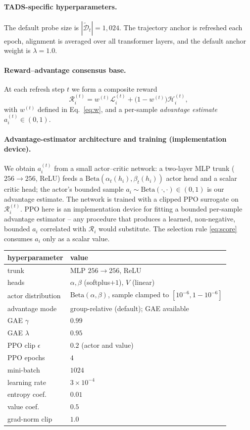 \paragraph{\textsc{TADS}-specific hyperparameters.}
The default probe size is
$|\widetilde{\mathcal{D}}_t|=1{,}024$. The trajectory anchor is
refreshed each epoch, alignment is averaged over all transformer
layers, and the default anchor weight is $\lambda=1.0$.

\paragraph{Reward--advantage consensus base.}
At each refresh step $t$ we form a composite reward
\[
\mathcal{R}_i^{(t)}
=
w^{(t)}\mathcal{L}_i^{(t)}
+
\bigl(1-w^{(t)}\bigr)\mathcal{H}_i^{(t)},
\]
with $w^{(t)}$ defined in Eq.~\ref{eq:w}, and a per-sample
\emph{advantage estimate} $a_i^{(t)} \in (0,1)$.

\paragraph{Advantage-estimator architecture and training
(implementation device).}
We obtain $a_i^{(t)}$ from a small actor--critic network: a
two-layer MLP trunk ($256{\to}256$, ReLU) feeds a
$\mathrm{Beta}(\alpha_t(h_i),\beta_t(h_i))$ actor head and a scalar
critic head; the actor's bounded sample
$a_i \sim \mathrm{Beta}(\cdot,\cdot) \in (0,1)$ is our advantage
estimate. The network is trained with a clipped PPO surrogate on
$\mathcal{R}_i^{(t)}$. PPO here is an implementation device for
fitting a bounded per-sample advantage estimator -- any procedure
that produces a learned, non-negative, bounded $a_i$ correlated
with $\mathcal{R}_i$ would substitute. The selection rule
\eqref{eq:score} consumes $a_i$ only as a scalar value.

\begin{table}[h]
\centering
\small
\begin{tabular}{@{}ll@{}}
\toprule
hyperparameter & value \\
\midrule
trunk            & MLP $256 \to 256$, ReLU \\
heads            & $\alpha,\beta$ (softplus${+}1$), $V$ (linear) \\
actor distribution & $\mathrm{Beta}(\alpha,\beta)$, sample clamped to $[10^{-6}, 1{-}10^{-6}]$ \\
advantage mode   & group-relative (default); GAE available \\
GAE $\gamma$     & $0.99$ \\
GAE $\lambda$    & $0.95$ \\
PPO clip $\epsilon$ & $0.2$ (actor and value) \\
PPO epochs       & $4$ \\
mini-batch       & $1024$ \\
learning rate    & $3\times 10^{-4}$ \\
entropy coef.    & $0.01$ \\
value coef.      & $0.5$ \\
grad-norm clip   & $1.0$ \\
\bottomrule
\end{tabular}
\end{table}

